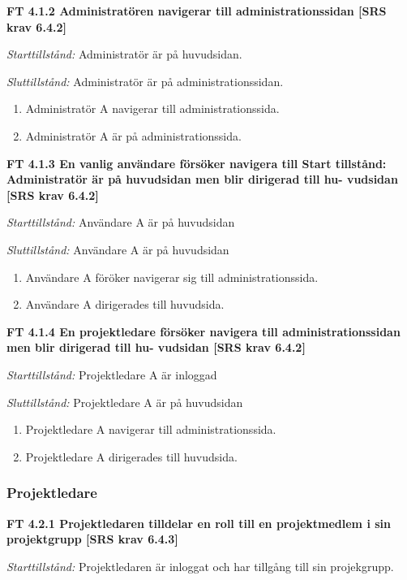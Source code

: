 \documentclass[a4paper]{article}
\begin{document}
\textbf{FT 4.1.2 Administratören navigerar till administrationssidan [SRS krav 6.4.2]}

\emph{Starttillstånd:} Administratör är på huvudsidan.

\emph{Sluttillstånd:} Administratör är på administrationssidan.

\begin{enumerate}
\item Administratör A navigerar till administrationssida.
\item Administratör A är på administrationssida.
\end{enumerate}

\textbf{FT 4.1.3 En vanlig användare försöker navigera till Start tillstånd: Administratör är på huvudsidan men blir dirigerad till hu- vudsidan [SRS krav 6.4.2]}

\emph{Starttillstånd:} Användare A är på huvudsidan

\emph{Sluttillstånd:} Användare A är på huvudsidan

\begin{enumerate}
\item Användare A föröker navigerar sig  till administrationssida.
\item Användare A dirigerades till huvudsida. 
\end{enumerate}

\textbf{FT 4.1.4 En projektledare försöker navigera till administrationssidan men blir dirigerad till hu- vudsidan [SRS krav 6.4.2]}

\emph{Starttillstånd:} Projektledare A är inloggad

\emph{Sluttillstånd:} Projektledare A är på huvudsidan 

\begin{enumerate}
\item Projektledare A navigerar till administrationssida.
\item Projektledare A dirigerades till huvudsida.

\end{enumerate}


\subsubsection{Projektledare}


\textbf{FT 4.2.1 Projektledaren tilldelar en roll till en projektmedlem i sin projektgrupp [SRS krav 6.4.3]}

\emph{Starttillstånd:} Projektledaren är inloggat och har tillgång till sin projekgrupp.
\end{document}

